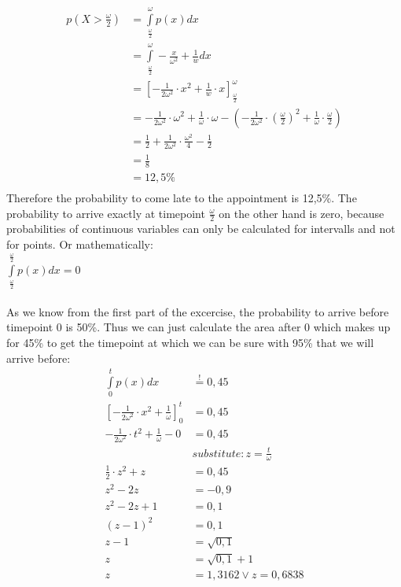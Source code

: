 \begin{align*}
  p(X > \frac{\omega}{2}) &= \int\limits_{\frac{\omega}{2}}^{\omega} p(x) dx \\
  &= \int\limits_{\frac{\omega}{2}}^{\omega} -\frac{x}{\omega^2} + \frac{1}{w} dx \\
  &= [-\frac{1}{2\omega^2}\cdot x^2 + \frac{1}{w}\cdot x]_{\frac{\omega}{2}}^{\omega} \\
  &= -\frac{1}{2\omega^2}\cdot \omega^2 + \frac{1}{\omega}\cdot \omega - (-\frac{1}{2\omega^2}\cdot (\frac{\omega}{2})^2 + \frac{1}{\omega}\cdot \frac{\omega}{2}) \\
  &= \frac{1}{2} + \frac{1}{2\omega^2}\cdot\frac{\omega^2}{4} - \frac{1}{2}\\
  &= \frac{1}{8}\\
  &= 12,5\% \\
\end{align*}
Therefore the probability to come late to the appointment is 12,5\%.
The probability to arrive exactly at timepoint $\frac{\omega}{2}$ on the other hand is zero, because probabilities of continuous variables can only be calculated for intervalls and not for points. Or mathematically:\\
$\int\limits_{\frac{\omega}{2}}^{\frac{\omega}{2}} p(x)dx = 0$
\\
\\
As we know from the first part of the excercise, the probability to arrive before timepoint 0 is 50\%. Thus we can just calculate the area after 0 which makes up for 45\% to get the timepoint at which we can be sure with 95\%  that we will arrive before: \\
\begin{align*}
  \int\limits_{0}^{t} p(x)dx &\stackrel{!}{=} 0,45\\
  [-\frac{1}{2\omega^2}\cdot x^2 + \frac{1}{\omega}]_0^t & = 0,45   \\
  -\frac{1}{2\omega^2}\cdot t^2 + \frac{1}{\omega} - 0 &= 0,45   \\
 & substitute: z=\frac{t}{\omega}\\
  \frac{1}{2}\cdot z^2 + z &= 0,45\\
  z^2 - 2z &= -0,9\\
  z^2 - 2z + 1 &= 0,1\\
  (z-1)^2 &= 0,1\\
  z-1 &= \sqrt{0,1}\\
  z &= \sqrt{0,1} + 1\\
  z &= 1,3162 \vee  z = 0,6838\\
\end{align*}



